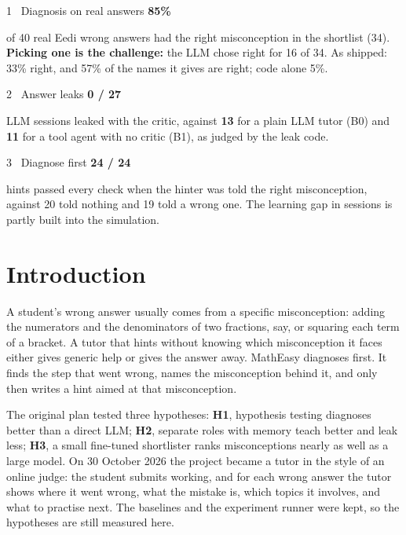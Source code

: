 \documentclass[11pt,a4paper]{article}
\newcommand{\bignum}[1]{{\sffamily\bfseries\fontsize{20}{22}\selectfont\color{primary}#1}\par\smallskip}
\begin{document}
\begin{tcbraster}[raster columns=3, raster equal height, raster column skip=6pt]
\begin{keyresult}{1 \textperiodcentered\ Diagnosis on real answers}
\bignum{85\%}
of 40 real Eedi wrong answers had the right misconception in the shortlist (34). \textbf{Picking one is the challenge:} the LLM chose right for 16 of 34. As shipped: 33\% right, and 57\% of the names it gives are right; code alone 5\%.
\end{keyresult}
\begin{keyresult}{2 \textperiodcentered\ Answer leaks}
\bignum{0 / 27}
LLM sessions leaked with the critic, against \textbf{13} for a plain LLM tutor (B0) and \textbf{11} for a tool agent with no critic (B1), as judged by the leak code.
\end{keyresult}
\begin{keyresult}{3 \textperiodcentered\ Diagnose first}
\bignum{24 / 24}
hints passed every check when the hinter was told the right misconception, against 20 told nothing and 19 told a wrong one. The learning gap in sessions is partly built into the simulation.
\end{keyresult}
\end{tcbraster}


\section{Introduction}

A student's wrong answer usually comes from a specific misconception: adding the numerators and the denominators of two fractions, say, or squaring each term of a bracket. A tutor that hints without knowing which misconception it faces either gives generic help or gives the answer away. MathEasy diagnoses first. It finds the step that went wrong, names the misconception behind it, and only then writes a hint aimed at that misconception.

The original plan tested three hypotheses: \textbf{H1}, hypothesis testing diagnoses better than a direct LLM; \textbf{H2}, separate roles with memory teach better and leak less; \textbf{H3}, a small fine-tuned shortlister ranks misconceptions nearly as well as a large model. On 30 October 2026 the project became a tutor in the style of an online judge: the student submits working, and for each wrong answer the tutor shows where it went wrong, what the mistake is, which topics it involves, and what to practise next. The baselines and the experiment runner were kept, so the hypotheses are still measured here.
\end{document}
